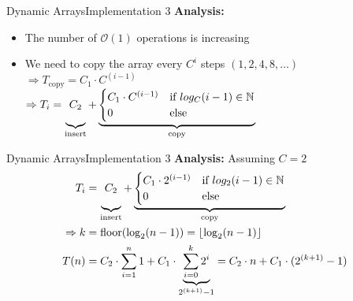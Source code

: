 
\begin{frame}{Dynamic Arrays}{Implementation 3}
  \textbf{Analysis:}
  \begin{itemize}
    \item
      The number of $\mathcal{O}(1)$ operations is increasing
    \item
      We need to copy the array every $C^i$ steps $(1, 2, 4, 8,\dots)$\\[0.5em]
      $\Rightarrow T_\text{copy} = C_1 \cdot C^{(i-1)}$\\
      $\Rightarrow T_i
        = \underbrace{
            C_2\vphantom{\begin{cases}C_1\\0\end{cases}}
          }_\text{insert}
          + \underbrace{\begin{cases}
            C_1 \cdot C^{(i-1)} & \text{if } log_C(i-1) \in \mathbb{N}\\
            0 & \text{else}
          \end{cases}}_\text{copy}$
  \end{itemize}
\end{frame}


\begin{frame}{Dynamic Arrays}{Implementation 3}
  \textbf{Analysis:}
  Assuming $C = 2$
  \begin{align*}
    T_i
      &= \underbrace{
        C_2\vphantom{\begin{cases}C_1\\0\end{cases}}
      }_\text{insert}
      + \underbrace{\begin{cases}
        C_1 \cdot 2^{(i-1)} & \text{if } log_2(i-1) \in \mathbb{N}\\
        0 & \text{else}
        \end{cases}}_\text{copy}\\
    \Rightarrow k &= \mathrm{floor}(\log_2(n-1))
      = \left\lfloor\log_2(n-1)\right\rfloor\\
    T(n) &= C_2 \cdot \sum_{i=1}^{n} 1
        + C_1 \cdot \underbrace{\sum_{i=0}^{k} 2^i}_{2^{(k+1)}-1}
      = C_2 \cdot n + C_1 \cdot (2^{(k+1)}-1)
  \end{align*}
\end{frame}

